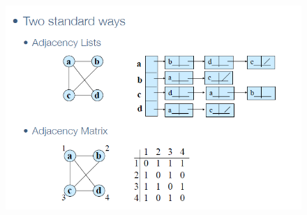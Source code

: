 \begin{figure}[h]
    \centering
    \includegraphics[width=0.75\linewidth]{graph representation.png}

\end{figure}

